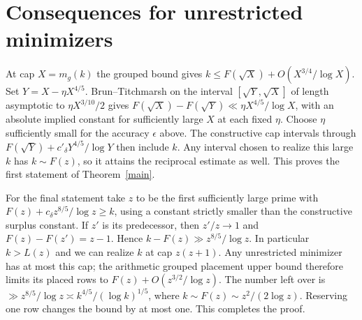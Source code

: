 \documentclass[11pt]{article}
\begin{document}
\section{Consequences for unrestricted minimizers}
At cap $X=m_g(k)$ the grouped bound gives $k\le F(\sqrt X)+O(X^{3/4}/\log X)$. Set $Y=X-\eta X^{4/5}$. Brun--Titchmarsh on the interval $[\sqrt Y,\sqrt X]$ of length asymptotic to $\eta X^{3/10}/2$ gives $F(\sqrt X)-F(\sqrt Y)\ll\eta X^{4/5}/\log X$, with an absolute implied constant for sufficiently large $X$ at each fixed $\eta$. Choose $\eta$ sufficiently small for the accuracy $\epsilon$ above. The constructive cap intervals through $F(\sqrt Y)+c'_\delta Y^{4/5}/\log Y$ then include $k$. Any interval chosen to realize this large $k$ has $k\sim F(z)$, so it attains the reciprocal estimate as well. This proves the first statement of Theorem~\ref{main}.

For the final statement take $z$ to be the first sufficiently large prime with $F(z)+c_\delta z^{8/5}/\log z\ge k$, using a constant strictly smaller than the constructive surplus constant. If $z'$ is its predecessor, then $z'/z\to1$ and $F(z)-F(z')=z-1$. Hence $k-F(z)\gg z^{8/5}/\log z$. In particular $k>L(z)$ and we can realize $k$ at cap $z(z+1)$. Any unrestricted minimizer has at most this cap; the arithmetic grouped placement upper bound therefore limits its placed rows to $F(z)+O(z^{3/2}/\log z)$. The number left over is $\gg z^{8/5}/\log z\asymp k^{4/5}/(\log k)^{1/5}$, where $k\sim F(z)\sim z^2/(2\log z)$. Reserving one row changes the bound by at most one. This completes the proof.
\end{document}

